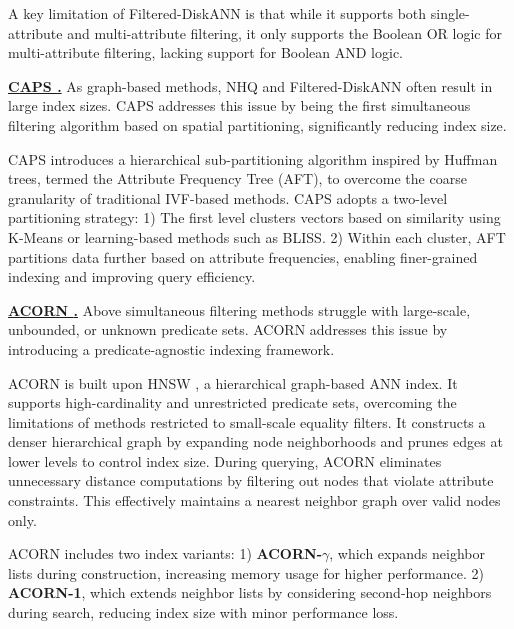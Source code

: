 \documentclass[sigconf, nonacm]{acmart}
\begin{document}
\begin{sloppypar}
A key limitation of Filtered-DiskANN is that while it supports both single-attribute and multi-attribute filtering, it only supports the Boolean OR logic for multi-attribute filtering, lacking support for Boolean AND logic.

\vspace{1em}
\noindent\textbf{\underline{CAPS \cite{CAPS}.}}  
As graph-based methods, NHQ and Filtered-DiskANN often result in large index sizes. CAPS addresses this issue by being the first simultaneous filtering algorithm based on spatial partitioning, significantly reducing index size.

CAPS introduces a hierarchical sub-partitioning algorithm inspired by Huffman trees, termed the Attribute Frequency Tree (AFT), to overcome the coarse granularity of traditional IVF-based methods. CAPS adopts a two-level partitioning strategy:  
1) The first level clusters vectors based on similarity using K-Means or learning-based methods such as BLISS.  
2) Within each cluster, AFT partitions data further based on attribute frequencies, enabling finer-grained indexing and improving query efficiency.

\vspace{1em}
\noindent\textbf{\underline{ACORN \cite{ACORN}.}}  
Above simultaneous filtering methods struggle with large-scale, unbounded, or unknown predicate sets.
ACORN addresses this issue by introducing a predicate-agnostic indexing framework.

ACORN is built upon HNSW \cite{hnsw}, a hierarchical graph-based ANN index. It supports high-cardinality and unrestricted predicate sets, overcoming the limitations of methods restricted to small-scale equality filters. It constructs a denser hierarchical graph by expanding node neighborhoods and prunes edges at lower levels to control index size. During querying, ACORN eliminates unnecessary distance computations by filtering out nodes that violate attribute constraints. This effectively maintains a nearest neighbor graph over valid nodes only. 

ACORN includes two index variants:  
1) \textbf{ACORN-$\gamma$}, which expands neighbor lists during construction, increasing memory usage for higher performance.  
2) \textbf{ACORN-1}, which extends neighbor lists by considering second-hop neighbors during search, reducing index size with minor performance loss.


\end{sloppypar}
\end{document}
